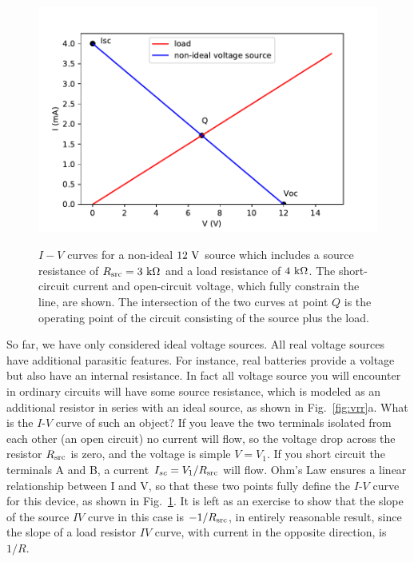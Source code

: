 \documentclass[12pt,oneside]{book}
\begin{document}
\begin{figure}[htbp]
\begin{center}
\includegraphics[height=0.3\textheight]{figs/thev_nonideal.pdf} \\
\caption{ $I-V$ curves for a non-ideal $12~\rm V$ source which includes a source resistance of $R_{\rm src} = 3~\rm k\Omega$ and a load resistance of $4~\rm k\Omega$.  The short-circuit current and open-circuit voltage, which fully constrain the line, are shown.  The intersection of the two curves at point $Q$ is the operating point of the circuit consisting of the source plus the load.}
\label{fig:vrr_iv}
\end{center}
\end{figure}

So far, we have only considered ideal voltage sources.  All real voltage sources have additional parasitic features.  For instance, real batteries provide a voltage but also have an internal resistance.  In fact all voltage source you will encounter in ordinary circuits will have some source resistance, which is modeled as an additional resistor in series with an ideal source, as shown in Fig.~\ref{fig:vrr}a.  What is the $I$-$V$ curve of such an object?  If you leave the two terminals isolated from each other (an open circuit) no current will flow, so the voltage drop across the resistor $R_{\rm src}$ is zero, and the voltage is simple $V = V_1$.
If you short circuit the terminals A and B, a current $I_{sc} = V_1 / R_{\rm src}$ will flow.  Ohm's Law ensures a linear relationship between I and V, so that these two points fully define the $I$-$V$ curve for this device, as shown in Fig.~\ref{fig:vrr_iv}.  It is left as an exercise to show that the slope of the source $IV$ curve in this case is $-1/R_{\rm src}$, in entirely reasonable result, since the slope of a load resistor $IV$ curve, with current in the opposite direction, is $1/R$.
\end{document}
